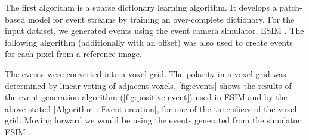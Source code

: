 \documentclass[10pt]{report}
\begin{document}
The first algorithm \cite{Barua16wacv} is a sparse dictionary learning algorithm. 
It develops a patch-based model for event streams by training an over-complete dictionary.
For the input dataset, we generated events using the event camera simulator, ESIM \cite{Rebecq18corl}.
The following algorithm \cite{Barua16wacv} (additionally with an offset) was also used to create events for each pixel from a reference image.\vspace{1ex}

\vspace{1ex}

The events were converted into a voxel grid. The polarity in a voxel grid was determined by linear voting of adjacent voxels. 
\autoref{fig:events} shows the results of the event generation algorithm (\autoref{fig:positive event}) used in ESIM and by the above stated \autoref{Algorithm : Event-creation}, for one of the time slices of the voxel grid. 
Moving forward we would be using the events generated from the simulator ESIM \cite{Rebecq18corl}.
\end{document}
